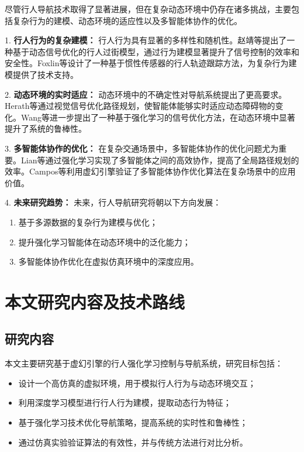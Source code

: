 尽管行人导航技术取得了显著进展，但在复杂动态环境中仍存在诸多挑战，主要包括复杂行为的建模、动态环境的适应性以及多智能体协作的优化。

1. \textbf{行人行为的复杂建模：} 行人行为具有显著的多样性和随机性。赵靖等\cite{zhao2014crossing}提出了一种基于动态信号优化的行人过街模型，通过行为建模显著提升了信号控制的效率和安全性。Foxlin等\cite{foxlin2005tracking}设计了一种基于惯性传感器的行人轨迹跟踪方法，为复杂行为建模提供了技术支持。

2. \textbf{动态环境的实时适应：} 动态环境中的不确定性对导航系统提出了更高要求。Herath等\cite{herath2020ronin}通过视觉信号优化路径规划，使智能体能够实时适应动态障碍物的变化。Wang等\cite{wang2013densetrajectory}进一步提出了一种基于强化学习的信号优化方法，在动态环境中显著提升了系统的鲁棒性。

3. \textbf{多智能体协作的优化：} 在复杂交通场景中，多智能体协作的优化问题尤为重要。Lian等\cite{lian2023inverseql}通过强化学习实现了多智能体之间的高效协作，提高了全局路径规划的效率。Campos等\cite{campos2021orbslam3}利用虚幻引擎验证了多智能体协作优化算法在复杂场景中的应用价值。

4. \textbf{未来研究趋势：} 未来，行人导航研究将朝以下方向发展：

\begin{enumerate}
  \item 基于多源数据的复杂行为建模与优化；
  \item 提升强化学习智能体在动态环境中的泛化能力；
  \item 多智能体协作优化在虚拟仿真环境中的深度应用。
\end{enumerate}

\section{本文研究内容及技术路线}

\subsection{研究内容}

本文主要研究基于虚幻引擎的行人强化学习控制与导航系统，研究目标包括：

\begin{itemize}
    \item 设计一个高仿真的虚拟环境，用于模拟行人行为与动态环境交互；
    \item 利用深度学习模型进行行人行为建模，提取动态行为特征；
    \item 基于强化学习技术优化导航策略，提高系统的实时性和鲁棒性；
    \item 通过仿真实验验证算法的有效性，并与传统方法进行对比分析。
\end{itemize}

